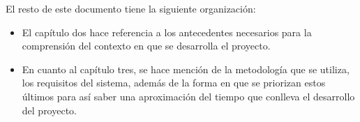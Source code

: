 El resto de este documento tiene la siguiente organización:

\begin{itemize}
    \item El capítulo dos hace referencia a los antecedentes necesarios para la comprensión del contexto en que se desarrolla el proyecto.
    \item En cuanto al capítulo tres, se hace mención de la metodología que se utiliza, los requisitos del sistema, además de la forma en que se priorizan estos últimos para así saber una aproximación del tiempo que conlleva el desarrollo del proyecto.
\end{itemize}

